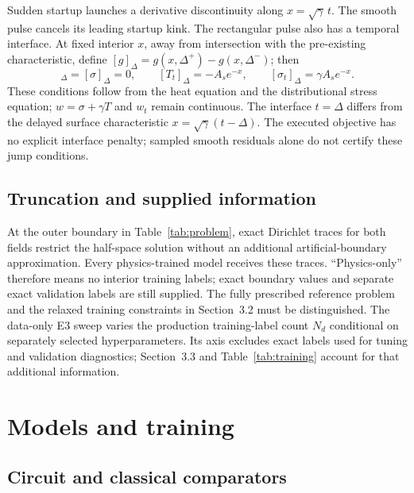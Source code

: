 \documentclass[11pt]{article}
\begin{document}
Sudden startup launches a derivative discontinuity along
$x=\sqrt\gamma\,t$. The smooth pulse cancels its leading startup kink.
The rectangular pulse also has a temporal interface. At fixed interior
$x$, away from intersection with the pre-existing characteristic, define
$[g]_\Delta=g(x,\Delta^+)-g(x,\Delta^-)$; then
\begin{equation}
 [T]_\Delta=[\sigma]_\Delta=0,\qquad
 [T_t]_\Delta=-A_s e^{-x},\qquad
 [\sigma_t]_\Delta=\gamma A_s e^{-x}.
 \label{eq:jumps}
\end{equation}
These conditions follow from the heat equation and the distributional
stress equation; $w=\sigma+\gamma T$ and $w_t$ remain continuous.
The interface $t=\Delta$ differs from the delayed surface characteristic
$x=\sqrt\gamma(t-\Delta)$. The executed objective has no explicit
interface penalty; sampled smooth residuals alone do not certify these
jump conditions.

\subsection{Truncation and supplied information}

At the outer boundary in Table~\ref{tab:problem}, exact Dirichlet traces
for both fields restrict the half-space solution without an additional
artificial-boundary approximation. Every physics-trained model receives these traces.
``Physics-only'' therefore means no interior training labels; exact
boundary values and separate exact validation labels are still supplied.
The fully prescribed reference problem and the relaxed training
constraints in Section~3.2 must be distinguished.
The data-only E3 sweep varies the production training-label count $N_d$
conditional on separately selected hyperparameters. Its axis excludes
exact labels used for tuning and validation diagnostics; Section~3.3 and
Table~\ref{tab:training} account for that additional information.

\section{Models and training}

\subsection{Circuit and classical comparators}
\end{document}
